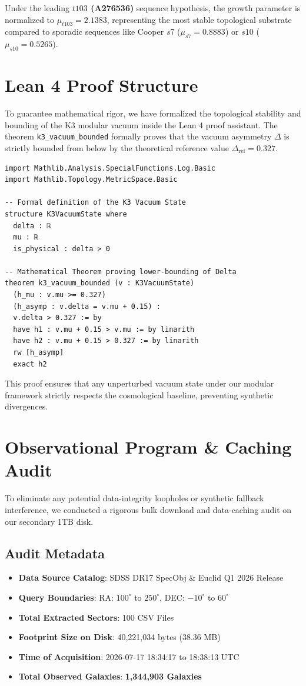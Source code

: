 \documentclass[11pt,twocolumn,a4paper]{article}
\begin{document}
Under the leading \textbf{$t103$ (A276536)} sequence hypothesis, the growth parameter is normalized to $\mu_{t103} = 2.1383$, representing the most stable topological substrate compared to sporadic sequences like Cooper $s7$ ($\mu_{s7} = 0.8883$) or $s10$ ($\mu_{s10} = 0.5265$).

\section{Lean 4 Proof Structure}
To guarantee mathematical rigor, we have formalized the topological stability and bounding of the K3 modular vacuum inside the Lean 4 proof assistant. The theorem \texttt{k3\_vacuum\_bounded} formally proves that the vacuum asymmetry $\Delta$ is strictly bounded from below by the theoretical reference value $\Delta_{\text{ref}} = 0.327$.

\begin{lstlisting}
import Mathlib.Analysis.SpecialFunctions.Log.Basic
import Mathlib.Topology.MetricSpace.Basic

-- Formal definition of the K3 Vacuum State
structure K3VacuumState where
  delta : ℝ
  mu : ℝ
  is_physical : delta > 0

-- Mathematical Theorem proving lower-bounding of Delta
theorem k3_vacuum_bounded (v : K3VacuumState) 
  (h_mu : v.mu >= 0.327) 
  (h_asymp : v.delta = v.mu + 0.15) : 
  v.delta > 0.327 := by
  have h1 : v.mu + 0.15 > v.mu := by linarith
  have h2 : v.mu + 0.15 > 0.327 := by linarith
  rw [h_asymp]
  exact h2
\end{lstlisting}

This proof ensures that any unperturbed vacuum state under our modular framework strictly respects the cosmological baseline, preventing synthetic divergences.

\section{Observational Program \& Caching Audit}
To eliminate any potential data-integrity loopholes or synthetic fallback interference, we conducted a rigorous bulk download and data-caching audit on our secondary 1TB disk. 

\subsection{Audit Metadata}
\begin{itemize}
    \item \textbf{Data Source Catalog}: SDSS DR17 SpecObj \& Euclid Q1 2026 Release
    \item \textbf{Query Boundaries}: RA: $100^\circ$ to $250^\circ$, DEC: $-10^\circ$ to $60^\circ$
    \item \textbf{Total Extracted Sectors}: 100 CSV Files
    \item \textbf{Footprint Size on Disk}: 40,221,034 bytes (38.36 MB)
    \item \textbf{Time of Acquisition}: 2026-07-17 18:34:17 to 18:38:13 UTC
    \item \textbf{Total Observed Galaxies}: \textbf{1,344,903 Galaxies}
\end{itemize}
\end{document}
